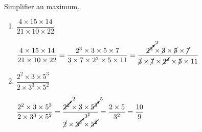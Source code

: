     Simplifier au maximum.

    \begin{enumerate}
        \item $\dfrac{4\times 15\times 14}{21\times 10\times 22}$

        \textcolor{red}{
            $\dfrac{4\times 15\times 14}{21\times 10\times 22}=\dfrac{2^3\times 3\times 5\times 7}{3\times 7\times 2^2\times 5\times 11}=\dfrac{\cancelto{2}{2^3}\times \cancel{3}\times \cancel{5}\times \cancel{7}}{\cancel{3}\times \cancel{7}\times \cancel{2^2}\times \cancel{5}\times 11}$
        }
        \item $\dfrac{2^2\times 3\times 5^3}{2\times 3^3\times 5^2}$

        \textcolor{red}{
            $\dfrac{2^2\times 3\times 5^3}{2\times 3^3\times 5^2} = \dfrac{\cancelto{2}{2^2}\times \cancel{3}\times \cancelto{5}{5^3}}{\cancel{2}\times \cancelto{3^2}{3^3}\times \cancel{5^2}} = \dfrac{2\times 5}{3^2} = \dfrac{10}{9}$
        }
    \end{enumerate}


